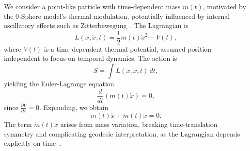 \documentclass[%
 reprint,
 amsmath,amssymb,
 aps,
]{revtex4-1}
\numberwithin{equation}{section}%
\begin{document}
We consider a point-like particle with time-dependent mass \( m(t) \), motivated by the 0-Sphere model's thermal modulation, potentially influenced by internal oscillatory effects such as Zitterbewegung~\cite{zitterbewegung1930}. The Lagrangian is
\begin{equation}
L(x, \dot{x}, t) = \frac{1}{2} m(t) \dot{x}^2 - V(t),
\label{eq:lagrangian}
\end{equation}
where \( V(t) \) is a time-dependent thermal potential, assumed position-independent to focus on temporal dynamics. The action is
\begin{equation}
S = \int L(x, \dot{x}, t) \, dt,
\end{equation}
yielding the Euler-Lagrange equation~\cite{goldstein2002}
\begin{equation}
\frac{d}{dt} \left( m(t) \dot{x} \right) = 0,
\end{equation}
since \( \frac{\partial V}{\partial x} = 0 \). Expanding, we obtain
\begin{equation}
m(t) \ddot{x} + \dot{m}(t) \dot{x} = 0.
\label{eq:euler_lagrange}
\end{equation}
The term \( \dot{m}(t) \dot{x} \) arises from mass variation, breaking time-translation symmetry and complicating geodesic interpretation, as the Lagrangian depends explicitly on time~\cite{landau1976}.
\end{document}
